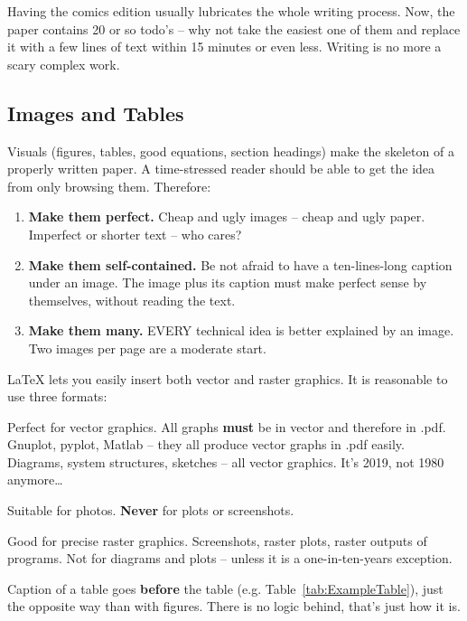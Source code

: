 \documentclass{ExcelAtFIT}
\begin{document}
Having the comics edition usually lubricates the whole writing process.  Now, the paper contains 20 or so todo's -- why not take the easiest one of them and replace it with a few lines of text within 15 minutes or even less.  Writing is no more a scary complex work.

\subsection{Images and Tables}
\label{sec:Images}

Visuals (figures, tables, good equations, section headings) make the skeleton of a properly written paper.  A time-stressed reader should be able to get the idea from only browsing them.
Therefore:
\begin{enumerate}[noitemsep]
\item \textbf{Make them perfect.}  Cheap and ugly images -- cheap and ugly paper.  Imperfect or shorter text -- who cares?
\item \textbf{Make them self-contained.}  Be not afraid to have a ten-lines-long caption under an image.  The image plus its caption must make perfect sense by themselves, without reading the text.
\item \textbf{Make them many.}  EVERY technical idea is better explained by an image.  Two images per page are a moderate start.
\end{enumerate}
\LaTeX{} lets you easily insert both vector and raster graphics. It is reasonable to use three formats:
\begin{description}[noitemsep]
\item[.pdf] Perfect for vector graphics.  All graphs \textbf{must} be in vector and therefore in .pdf.  Gnuplot, pyplot, Matlab -- they all produce vector graphs in .pdf easily.  Diagrams, system structures, sketches -- all vector graphics.  It's 2019, not 1980 anymore\ldots
\item[.jpg] Suitable for photos.  \textbf{Never} for plots or screenshots.
\item[.png] Good for precise raster graphics.  Screenshots, raster plots, raster outputs of programs.  Not for diagrams and plots -- unless it is a one-in-ten-years exception.
\end{description}
Caption of a table goes \textbf{before} the table (e.g. Table~\ref{tab:ExampleTable}), just the opposite way than with figures.  There is no logic behind, that's just how it is.
\end{document}
